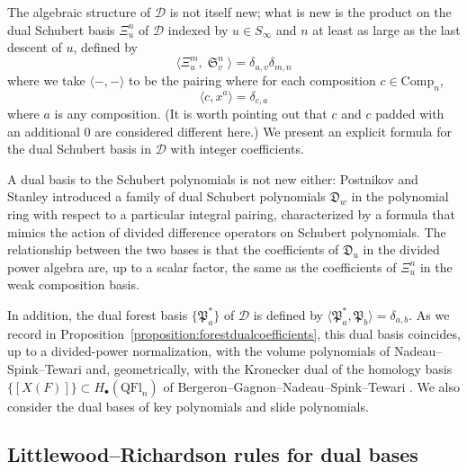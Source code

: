 \documentclass[a4paper,fleqn]{cas-sc}
\theoremstyle{definition}
\theoremstyle{remark}
\numberwithin{equation}{subsection}
\DeclareMathOperator{\sch}{\mathfrak{S}}
\newcommand{\dsch}{\ensuremath{\Xi}}
\newcommand{\dcoma}{\mathcal{D}}
\newcommand{\forest}{\mathfrak{P}}
\begin{document}
The algebraic structure of $\dcoma$ is not itself new; what is new is the product on the dual Schubert basis $\dsch_u^n$ of $\dcoma$ indexed by $u\in S_\infty$ and $n$ at least as large as the last descent of $u$, defined by
$$\langle \dsch_u^m, \sch_v^n\rangle = \delta_{u,v}\delta_{m,n}$$
where we take $\langle -,-\rangle$ to be the pairing where for each composition $c\in\mathrm{Comp}_n$,
$$\langle c, x^a\rangle = \delta_{c,a}$$
where $a$ is any composition. (It is worth pointing out that $c$ and $c$ padded with an additional $0$ are considered different here.) We present an explicit formula for the dual Schubert basis in $\dcoma$ with integer coefficients.

A dual basis to the Schubert polynomials is not new either: Postnikov and Stanley \cite{postnikov2009chains} introduced a family of dual Schubert polynomials $\mathfrak{D}_w$ in the polynomial ring with respect to a particular integral pairing, characterized by a formula that mimics the action of divided difference operators on Schubert polynomials. The relationship between the two bases is that the coefficients of $\mathfrak{D}_u$ in the divided power algebra are, up to a scalar factor, the same as the coefficients of $\dsch_u^n$ in the weak composition basis. 

In addition, the dual forest basis $\{\forest_a^*\}$ of $\dcoma$ is defined by $\langle\forest_a^*,\forest_b\rangle=\delta_{a,b}$. As we record in Proposition~\ref{proposition:forestdualcoefficients}, this dual basis coincides, up to a divided-power normalization, with the volume polynomials of Nadeau--Spink--Tewari \cite{nadeau2024quasisymmetric} and, geometrically, with the Kronecker dual of the homology basis $\{[X(F)]\}\subset H_\bullet(\mathrm{QFl}_n)$ of Bergeron--Gagnon--Nadeau--Spink--Tewari \cite{bergeron2025qsymflag}. We also consider the dual bases of key polynomials and slide polynomials.

\subsection*{Littlewood--Richardson rules for dual bases}
\end{document}
